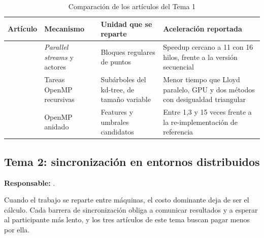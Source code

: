 \begin{table}[H]
\caption{Comparación de los artículos del Tema 1}\label{tab:sintesis1}
\small
\begin{tabularx}{\textwidth}{@{}L{3.3cm}YYY@{}}
\toprule
\textbf{Artículo} & \textbf{Mecanismo} & \textbf{Unidad que se reparte} & \textbf{Aceleración reportada} \\
\midrule
\textcite{nigro2022} & \textit{Parallel streams} y actores & Bloques regulares de puntos
  & Speedup cercano a 11 con 16 hilos, frente a la versión secuencial \\
\addlinespace
\textcite{kwedlo2021} & Tareas OpenMP recursivas & Subárboles del kd-tree, de tamaño variable
  & Menor tiempo que Lloyd paralelo, GPU y dos métodos con desigualdad triangular \\
\addlinespace
\textcite{kwedlo2024} & OpenMP anidado & Features y umbrales candidatos
  & Entre 1,3 y 15 veces frente a la re-implementación de referencia \\
\bottomrule
\end{tabularx}
\end{table}

\subsection{Tema 2: sincronización en entornos distribuidos}

\textbf{Responsable:} \nombreDayana.

Cuando el trabajo se reparte entre máquinas, el costo dominante deja de ser el cálculo. Cada
barrera de sincronización obliga a comunicar resultados y a esperar al participante más lento, y
los tres artículos de este tema buscan pagar menos por ella.

